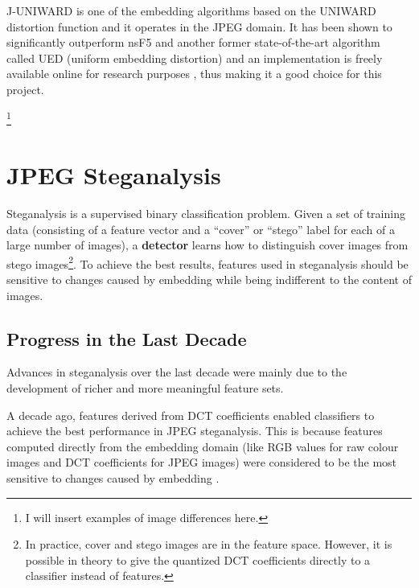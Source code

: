 \documentclass[11pt,a4paper,twoside,openright]{report}
\begin{document}
J-UNIWARD is one of the embedding algorithms based on the UNIWARD distortion function and it operates in the JPEG domain. It has been shown \cite{uniward-paper} to significantly outperform nsF5 and another former state-of-the-art algorithm called UED (uniform embedding distortion) and an implementation is freely available online for research purposes \cite{binghamton-embedding}, thus making it a good choice for this project.

\footnote{I will insert examples of image differences here.} %


\section{JPEG Steganalysis}

Steganalysis is a supervised binary classification problem. Given a set of training data (consisting of a feature vector and a ``cover'' or ``stego'' label for each of a large number of images), a \textbf{detector} learns how to distinguish cover images from stego images\footnote{In practice, cover and stego images are in the feature space. However, it is possible in theory to give the quantized DCT coefficients directly to a classifier instead of features.}. To achieve the best results, features used in steganalysis should be sensitive to changes caused by embedding while being indifferent to the content of images.


\subsection{Progress in the Last Decade} \label{sec:steganalysis-progress}

Advances in steganalysis over the last decade were mainly due to the development of richer and more meaningful feature sets.

A decade ago, features derived from DCT coefficients enabled classifiers to achieve the best performance in JPEG steganalysis. This is because features computed directly from the embedding domain (like RGB values for raw colour images and DCT coefficients for JPEG images) were considered to be the most sensitive to changes caused by embedding \cite{blind-steganalysis}.
\end{document}
